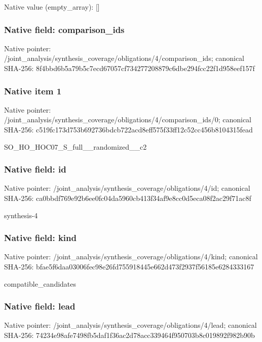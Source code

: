 \documentclass[10pt,a4paper]{article}
\begin{document}
Native value (empty\_\allowbreak{}array): []

\subsubsection{Native field: comparison\_\allowbreak{}ids}
Native pointer: /joint\_\allowbreak{}analysis/synthesis\_\allowbreak{}coverage/obligations/4/comparison\_\allowbreak{}ids; canonical SHA-256: 8f4bbd6b5a79b5c7ecd67057cf734277208879c6dbe294fcc22f1d958eef157f

\subsubsection{Native item 1}
Native pointer: /joint\_\allowbreak{}analysis/synthesis\_\allowbreak{}coverage/obligations/4/comparison\_\allowbreak{}ids/0; canonical SHA-256: c519fc173d753b692736bdcb722acd8eff575f33ff12c52cc456b8104315fead

\begingroup\raggedright\sloppy SO\_\allowbreak{}HO\_\allowbreak{}HOC07\_\allowbreak{}S\_\allowbreak{}full\_\allowbreak{}\_\allowbreak{}randomized\_\allowbreak{}\_\allowbreak{}c2\par\endgroup

\subsubsection{Native field: id}
Native pointer: /joint\_\allowbreak{}analysis/synthesis\_\allowbreak{}coverage/obligations/4/id; canonical SHA-256: ca0bbdf769e92b6ee0fc04da5960cb413f34af9e8cc0d5eca08f2ac29f71ac8f

\begingroup\raggedright\sloppy synthesis-4\par\endgroup

\subsubsection{Native field: kind}
Native pointer: /joint\_\allowbreak{}analysis/synthesis\_\allowbreak{}coverage/obligations/4/kind; canonical SHA-256: bfae5f6daa03006fec98e26fd755918445e662d473f2937f56185e6284333167

\begingroup\raggedright\sloppy compatible\_\allowbreak{}candidates\par\endgroup

\subsubsection{Native field: lead}
Native pointer: /joint\_\allowbreak{}analysis/synthesis\_\allowbreak{}coverage/obligations/4/lead; canonical SHA-256: 74234e98afe7498fb5daf1f36ac2d78acc339464f950703b8c019892f982b90b
\end{document}
